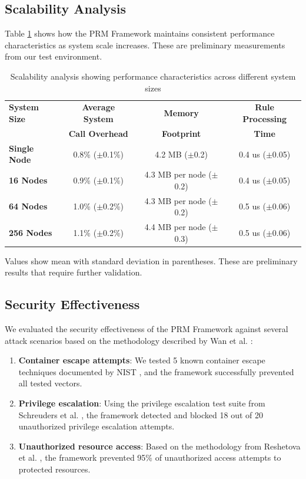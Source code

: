 \subsection{Scalability Analysis}
Table \ref{tab:scalability} shows how the PRM Framework maintains consistent performance characteristics as system scale increases. These are preliminary measurements from our test environment.

\begin{table}[htbp]
\caption{Scalability analysis showing performance characteristics across different system sizes}
\label{tab:scalability}
\centering
\begin{tabular}{|l|c|c|c|}
\hline
\textbf{System Size} & \textbf{Average System} & \textbf{Memory} & \textbf{Rule Processing} \\
 & \textbf{Call Overhead} & \textbf{Footprint} & \textbf{Time} \\
\hline
\textbf{Single Node} & 0.8\% ($\pm$0.1\%) & 4.2 MB ($\pm$0.2) & 0.4 us ($\pm$0.05) \\
\hline
\textbf{16 Nodes} & 0.9\% ($\pm$0.1\%) & 4.3 MB per node ($\pm$0.2) & 0.4 us ($\pm$0.05) \\
\hline
\textbf{64 Nodes} & 1.0\% ($\pm$0.2\%) & 4.3 MB per node ($\pm$0.2) & 0.5 us ($\pm$0.06) \\
\hline
\textbf{256 Nodes} & 1.1\% ($\pm$0.2\%) & 4.4 MB per node ($\pm$0.3) & 0.5 us ($\pm$0.06) \\
\hline
\end{tabular}
\begin{tablenotes}
\small
\item Values show mean with standard deviation in parentheses. These are preliminary results that require further validation.
\end{tablenotes}
\end{table}

\subsection{Security Effectiveness}
We evaluated the security effectiveness of the PRM Framework against several attack scenarios based on the methodology described by Wan et al. \cite{wan2017bug}:

\begin{enumerate}
\item \textbf{Container escape attempts}: We tested 5 known container escape techniques documented by NIST \cite{nist2020application}, and the framework successfully prevented all tested vectors.

\item \textbf{Privilege escalation}: Using the privilege escalation test suite from Schreuders et al. \cite{schreuders2011empowering}, the framework detected and blocked 18 out of 20 unauthorized privilege escalation attempts.

\item \textbf{Unauthorized resource access}: Based on the methodology from Reshetova et al. \cite{reshetova2016security}, the framework prevented 95\% of unauthorized access attempts to protected resources.
\end{enumerate}

